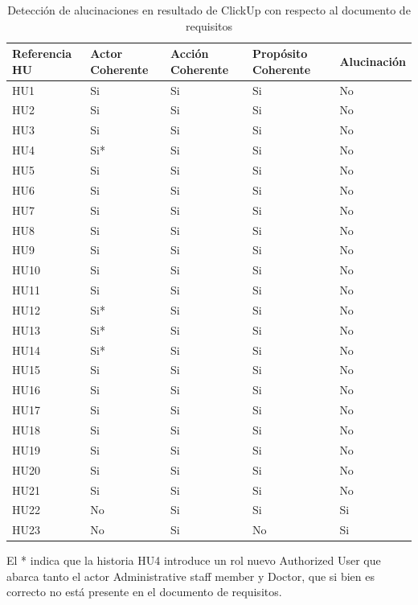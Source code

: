 \begin{longtable}{|l|p{2cm}|p{2cm}|p{2cm}|l|}
\caption{Detección de alucinaciones en resultado de ClickUp con respecto al documento de requisitos}
\label{tab:alucinaciones} \\
\hline
\textbf{Referencia HU} & \textbf{Actor Coherente} & \textbf{Acción Coherente} & \textbf{Propósito Coherente}  & \textbf{Alucinación} \\ \hline
\endfirsthead

\hline
\endfoot

\hline
\endlastfoot

HU1 & Si & Si & Si & No \\ \hline
HU2 & Si & Si & Si & No \\ \hline
HU3 & Si & Si & Si & No \\ \hline
HU4 & Si* & Si & Si & No \\ \hline
HU5 & Si & Si & Si & No \\ \hline

HU6 & Si & Si & Si & No \\ \hline
HU7 & Si & Si & Si & No \\ \hline
HU8 & Si & Si & Si & No \\ \hline
HU9 & Si & Si & Si & No \\ \hline
HU10 & Si & Si & Si & No \\ \hline
HU11 & Si & Si & Si & No \\ \hline
HU12 & Si* & Si & Si & No \\ \hline

HU13 & Si* & Si & Si & No \\ \hline
HU14 & Si* & Si & Si & No \\ \hline
HU15 & Si & Si & Si & No \\ \hline
HU16 & Si & Si & Si & No \\ \hline
HU17 & Si & Si & Si & No \\ \hline
HU18 & Si & Si & Si & No \\ \hline

HU19 & Si & Si & Si & No \\ \hline
HU20 & Si & Si & Si & No \\ \hline
HU21 & Si & Si & Si & No \\ \hline
HU22 & No & Si & Si & Si \\ \hline
HU23 & No & Si & No & Si \\
\end{longtable}


El * indica que la historia HU4 introduce un rol nuevo Authorized User que abarca tanto el actor Administrative staff member y Doctor, que si bien es correcto no está presente en el documento de requisitos.


